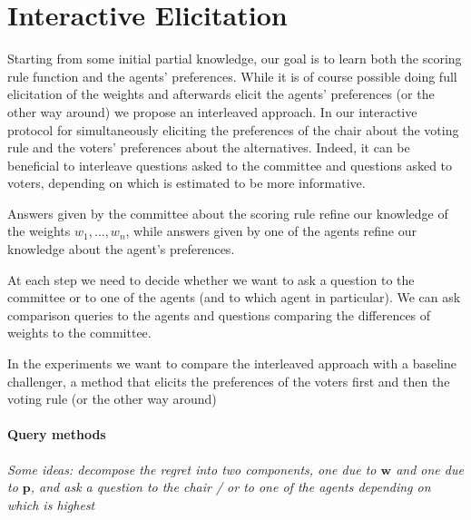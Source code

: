 \documentclass[12pt]{article}
\newcommand{\pprofile}{\textbf{p}}%
\newcommand{\w}{\textbf{w}}%
\begin{document}
\section{Interactive Elicitation}
Starting from some initial partial knowledge, our goal is to learn both the scoring rule function and the agents' preferences.
While it is of course possible doing full elicitation of the weights and afterwards elicit the agents' preferences (or the other way around) we propose an interleaved approach.
In our interactive  protocol for simultaneously eliciting the preferences of the chair about the voting rule and the voters' preferences about the alternatives.
Indeed, it can be beneficial to interleave questions asked to the committee and questions asked to voters, depending on which is estimated to be more informative.

Answers given by the committee about the scoring rule refine our knowledge of the weights $w_1,\ldots,w_n$, while
answers given by one of the agents refine our knowledge about the agent's preferences.

At each step we need to decide whether we want to ask a question to the committee or to one of the agents (and to which agent in particular). We can ask comparison queries to the agents and questions comparing the differences of weights to the committee. 

In the experiments we want to compare the interleaved approach with a baseline challenger, a method  that elicits the preferences of the voters first and then the voting rule (or the other way around)




\paragraph{Query methods}

{\em Some ideas: decompose the regret into two components, one due to $\w$ and one due to $\pprofile$, and ask a question to the chair / or to one of the agents depending on which is highest}

\end{document}

